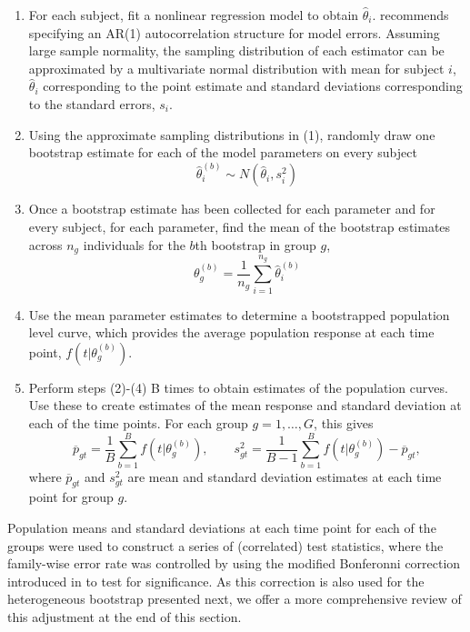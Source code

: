 \documentclass{article}
\begin{document}
\begin{enumerate}
\item For each subject, fit a nonlinear regression model to obtain $\hat{\theta}_i$. \citet{oleson2017detecting} recommends specifying an AR(1) autocorrelation structure for model errors. Assuming large sample normality, the sampling distribution of each estimator can be approximated by a multivariate normal distribution with mean for subject $i$, $\hat{\theta}_i$ corresponding to the point estimate and standard deviations corresponding to the standard errors, $s_i$.

\item Using the approximate sampling distributions in (1), randomly draw one bootstrap estimate for each of the model parameters on every subject 
\begin{equation}
\hat{\theta}_i^{(b)} \sim N( \hat{\theta}_i, s_i^2)
\end{equation}

\item Once a bootstrap estimate has been collected for each parameter and for every subject, for each parameter, find the mean of the bootstrap estimates across $n_g$ individuals for the $b$th bootstrap in group $g$,
\begin{equation}
\theta_g^{(b)} = \frac{1}{n_g} \sum_{i=1}^{n_g} \hat{\theta}_i^{(b)}
\end{equation}
\item Use the mean parameter estimates to determine a bootstrapped population level curve, which provides the average population response at each time point, $f(t| \theta_g^{(b)})$.

\item Perform steps (2)-(4) B times to obtain estimates of the population curves. Use these to create estimates of the mean response and standard deviation at each of the time points. For each group $g = 1, \dots, G$, this gives
\begin{equation}
\overline{p}_{gt} = \frac1B \sum_{b=1}^B f(t| \theta_g^{(b)}), \qquad s_{gt}^2 = \frac{1}{B-1} \sum_{b=1}^B  f(t| \theta_g^{(b)}) - \overline{p}_{gt},
\end{equation}
where $\overline{p}_{gt}$ and $s_{gt}^2$ are mean and standard deviation estimates at each time point for group $g$.
\end{enumerate}

Population means and standard deviations at each time point for each of the groups were used to construct a series of (correlated) test statistics, where the family-wise error rate was controlled by using the modified Bonferonni correction introduced in \citet{oleson2017detecting} to test for significance. As this correction is also used for the heterogeneous bootstrap presented next, we offer a more comprehensive review of this adjustment at the end of this section. 
\end{document}
